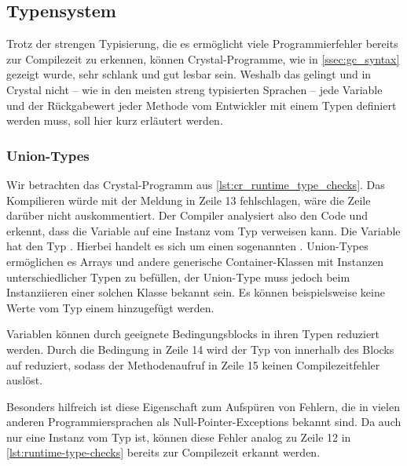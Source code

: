 \subsection{Typensystem}
\label{ssec:gc_typensystem}

Trotz der strengen Typisierung, die es ermöglicht viele Programmierfehler
bereits zur Compilezeit zu erkennen, können Crystal-Programme, wie in
\cref{ssec:gc_syntax} gezeigt wurde, sehr schlank und gut lesbar sein.  Weshalb
das gelingt und in Crystal nicht -- wie in den meisten streng typisierten
Sprachen -- jede Variable und der Rückgabewert jeder Methode vom Entwickler mit
einem Typen definiert werden muss, soll hier kurz erläutert werden.

\subsubsection{Union-Types}
\label{sssec:gct_union_types}

Wir betrachten das Crystal-Programm aus \cref{lst:cr_runtime_type_checks}.  Das
Kompilieren würde mit der Meldung in Zeile 13 fehlschlagen, wäre die Zeile
darüber nicht auskommentiert.  Der Compiler analysiert also den Code und
erkennt, dass die Variable  auf eine Instanz vom Typ 
verweisen kann.  Die Variable hat den Typ .  Hierbei handelt
es sich um einen sogenannten .  Union-Types
ermöglichen es Arrays und andere generische Container-Klassen mit Instanzen
unterschiedlicher Typen zu befüllen, der Union-Type muss jedoch beim
Instanziieren einer solchen Klasse bekannt sein.  Es können beispielsweise
keine Werte vom Typ  einem  hinzugefügt
werden.

Variablen können durch geeignete Bedingungsblocks in ihren Typen reduziert
werden.  Durch die Bedingung in Zeile 14 wird der Typ von  innerhalb
des Blocks auf  reduziert, sodass der Methodenaufruf in
Zeile 15 keinen Compilezeitfehler auslöst.

Besonders hilfreich ist diese Eigenschaft zum Aufspüren von Fehlern, die in
vielen anderen Programmiersprachen als Null-Pointer-Exceptions bekannt sind.  Da
 auch nur eine Instanz vom Typ  ist, können diese Fehler
analog zu Zeile 12 in \cref{lst:runtime-type-checks} bereits zur Compilezeit erkannt
werden.



